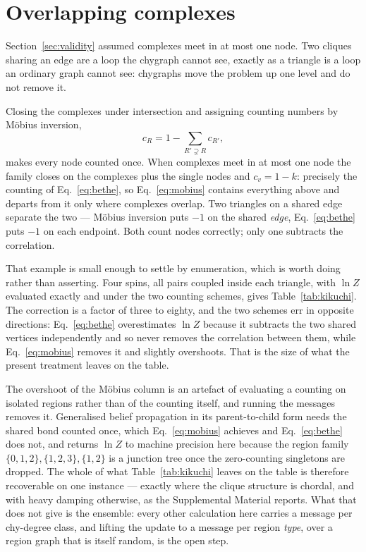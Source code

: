 \documentclass[aps,pre,twocolumn,superscriptaddress,floatfix]{revtex4-2}
\begin{document}
\section{Overlapping complexes}
\label{sec:regions}

Section~\ref{sec:validity} assumed complexes meet in at most one node. Two
cliques sharing an edge are a loop the chygraph cannot see, exactly as a triangle
is a loop an ordinary graph cannot see: chygraphs move the problem up one level
and do not remove it.

Closing the complexes under intersection and assigning counting numbers by
Möbius inversion,
\begin{equation}
  c_R=1-\sum_{R'\supsetneq R}c_{R'},
  \label{eq:mobius}
\end{equation}
makes every node counted once. When complexes meet in at most one node the
family closes on the complexes plus the single nodes and $c_v=1-k$: precisely the
counting of Eq.~\eqref{eq:bethe}, so Eq.~\eqref{eq:mobius} contains everything
above and departs from it only where complexes overlap. Two triangles on a shared
edge separate the two --- Möbius inversion puts $-1$ on the shared \emph{edge},
Eq.~\eqref{eq:bethe} puts $-1$ on each endpoint. Both count nodes correctly; only
one subtracts the correlation.

That example is small enough to settle by enumeration, which is worth doing
rather than asserting. Four spins, all pairs coupled inside each triangle, with
$\ln Z$ evaluated exactly and under the two counting schemes, gives
Table~\ref{tab:kikuchi}. The correction is a factor of three to eighty, and the
two schemes err in opposite directions: Eq.~\eqref{eq:bethe} overestimates
$\ln Z$ because it subtracts the two shared vertices independently and so never
removes the correlation between them, while Eq.~\eqref{eq:mobius} removes it and
slightly overshoots. That is the size of what the present treatment leaves on
the table.

The overshoot of the Möbius column is an artefact of evaluating a counting on
isolated regions rather than of the counting itself, and running the messages
removes it. Generalised belief propagation in its parent-to-child form
\cite{YFW05} needs the shared bond counted once, which Eq.~\eqref{eq:mobius}
achieves and Eq.~\eqref{eq:bethe} does not, and returns $\ln Z$ to machine
precision here because the region family $\{0,1,2\},\{1,2,3\},\{1,2\}$ is a
junction tree once the zero-counting singletons are dropped. The whole of what
Table~\ref{tab:kikuchi} leaves on the table is therefore recoverable on one
instance --- exactly where the clique structure is chordal, and with heavy
damping otherwise, as the Supplemental Material reports. What that does not give
is the ensemble: every other calculation here carries a message per chy-degree
class, and lifting the update to a message per region \emph{type}, over a region
graph that is itself random, is the open step.
\end{document}
